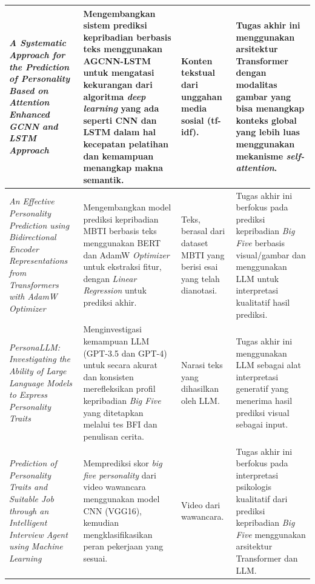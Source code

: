 {\begin{xltabular}{\textwidth}{|
			>{\hsize}X |
			>{\hsize}X |
			>{\hsize}X |
			>{\hsize}X | }
		\textit{A Systematic Approach for the Prediction of Personality Based on Attention Enhanced GCNN and LSTM Approach} \parencite{Sharma2023} &
		Mengembangkan sistem prediksi kepribadian berbasis teks menggunakan AGCNN-LSTM untuk mengatasi kekurangan dari algoritma \textit{deep learning} yang ada seperti CNN dan LSTM dalam hal kecepatan pelatihan dan kemampuan menangkap makna semantik. &
		Konten tekstual dari unggahan media sosial (tf-idf). &
		Tugas akhir ini menggunakan arsitektur Transformer dengan modalitas gambar yang bisa menangkap konteks global yang lebih luas menggunakan mekanisme \textit{self-attention}. \\ \hline

		\textit{An Effective Personality Prediction using Bidirectional Encoder Representations from Transformers with AdamW Optimizer} \parencite{Devi2024} &
		Mengembangkan model prediksi kepribadian MBTI berbasis teks menggunakan BERT dan AdamW \textit{Optimizer} untuk ekstraksi fitur, dengan \textit{Linear Regression} untuk prediksi akhir. &
		Teks, berasal dari dataset MBTI yang berisi esai yang telah dianotasi. &
		Tugas akhir ini berfokus pada prediksi kepribadian \textit{Big Five} berbasis visual/gambar dan menggunakan LLM untuk interpretasi kualitatif hasil prediksi. \\ \hline
		
		\textit{PersonaLLM: Investigating the Ability of Large Language Models to Express Personality Traits} \parencite{Jiang2024} &
		Menginvestigasi kemampuan LLM (GPT-3.5 dan GPT-4) untuk secara akurat dan konsisten merefleksikan profil kepribadian \textit{Big Five} yang ditetapkan melalui tes BFI dan penulisan cerita. &
		Narasi teks yang dihasilkan oleh LLM. &
		Tugas akhir ini menggunakan LLM sebagai alat interpretasi generatif yang menerima hasil prediksi visual sebagai input. \\ \hline

		\textit{Prediction of Personality Traits and Suitable Job through an Intelligent Interview Agent using Machine Learning} \parencite{Mandakini2023} &
		Memprediksi skor \textit{big five personality} dari video wawancara menggunakan model CNN (VGG16), kemudian mengklasifikasikan peran pekerjaan yang sesuai. &
		Video dari wawancara. &
		Tugas akhir ini berfokus pada interpretasi psikologis kualitatif dari prediksi kepribadian \textit{Big Five} menggunakan arsitektur Transformer dan LLM. \\ \hline
		

\end{xltabular}}
